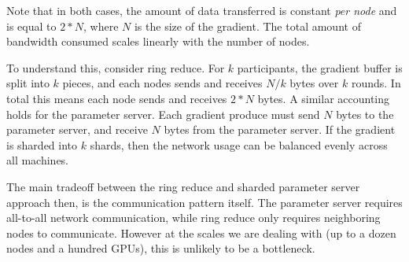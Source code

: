 Note that in both cases, the amount of data transferred is constant \textit{per node} and is equal to $2 * N$, where $N$ is the size of the gradient. The total amount of bandwidth consumed scales linearly with the number of nodes.

To understand this, consider ring reduce. For $k$ participants, the gradient buffer is split into $k$ pieces, and each nodes sends and receives $N / k$ bytes over $k$ rounds. In total this means each node sends and receives $2 * N$ bytes. A similar accounting holds for the parameter server. Each gradient produce must send $N$ bytes to the parameter server, and receive $N$ bytes from the parameter server. If the gradient is sharded into $k$ shards, then the network usage can be balanced evenly across all machines.

The main tradeoff between the ring reduce and sharded parameter server approach then, is the communication pattern itself. The parameter server requires all-to-all network communication, while ring reduce only requires neighboring nodes to communicate. However at the scales we are dealing with (up to a dozen nodes and a hundred GPUs), this is unlikely to be a bottleneck.
